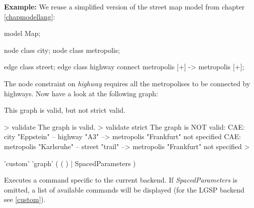{\small \textbf{Example:} We reuse a simplified version of the street map model from chapter \ref{chapmodellang}:
\begin{grgen} 
model Map;

node class city;
node class metropolis;

edge class street;
edge class highway
      connect metropolis [+] -> metropolis [+];
\end{grgen}
The node constraint on \emph{highway} requires all the metropolises to be connected by highways. Now have a look at the following graph:
\begin{center}
\end{center}

This graph is valid, but not strict valid.
\begin{grshell} 
> validate
The graph is valid.
> validate strict
The graph is NOT valid:
  CAE: city "Eppstein" -- highway "A3" --> metropolis 
            "Frankfurt" not specified
  CAE: metropolis "Karlsruhe" -- street "trail" --> 
            metropolis "Frankfurt" not specified
>
\end{grshell}}

\begin{rail}
  'custom' 'graph' ( ( ) | SpacedParameters )
\end{rail}
Executes a command specific to the current backend. If \emph{SpacedParameters} is omitted, a list of available commands will be displayed (for the LGSP backend see \ref{custom}).

